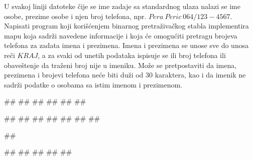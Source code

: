 \begin{Answer}[ref=4_15]
\end{Answer}


\begin{Exercise}[label=4_16]
U svakoj liniji datoteke čije se ime zadaje sa standardnog ulaza nalazi se ime osobe, prezime osobe i njen broj telefona, npr. $Pera\ Peric\ 064/123-4567$. Napisati program koji korišćenjem binarnog pretraživačkog stabla implementira mapu koja sadrži navedene informacije i koja će omogućiti pretragu brojeva telefona za zadata imena i prezimena. Imena i prezimena se unose sve do unosa reči $KRAJ$, a za svaki od unetih podataka ispisuje se ili broj telefona ili obaveštenje da traženi broj nije u imeniku. Može se pretpostaviti da imena, prezimena i brojevi telefona neće biti duži od $30$ karaktera, kao i da imenik ne sadrži podatke o osobama sa istim imenom i prezimenom.

\begin{miditest}
\begin{upotreba}{1}
##  
##
##
##
##
##
          
#\naslovInt#
##
##	
##
##
##
##
\end{upotreba}
\end{miditest}
\begin{miditest}
\begin{upotreba}{2}
##
  
#\naslovInt#
##
#\naslovIzlazZaGresku#
##
##
\end{upotreba}
\end{miditest}
\end{Exercise}

\begin{Answer}[ref=4_16]
\end{Answer}

